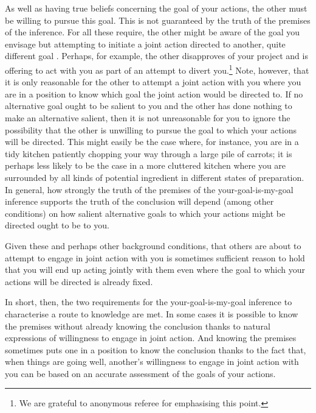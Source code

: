 \documentclass[12pt,\papersize]{extarticle}
\begin{document}
As well as having true beliefs concerning the goal of your actions, the other must be willing to pursue this goal. 
This is not guaranteed by the truth of the premises of the inference. 
For all these require, the other might be aware of the goal you envisage but attempting to initiate a joint action directed to another, quite different goal%
.  
Perhaps, for example, the other disapproves of your project and is offering to act with you as part of an attempt to divert you.\footnote{
We are grateful to anonymous referee for emphasising this point.
}
Note, however, that it is only reasonable for the other to attempt a joint action with you where you are in a position to know which goal the joint action would be directed to. 
If no alternative goal ought to be salient to you and the other has done nothing to make an alternative salient, then it is not unreasonable for you to ignore the possibility that the other is unwilling to pursue the goal to which your actions will be directed. 
This might easily be the case where, for instance, you are in a tidy kitchen patiently chopping your way through a large pile of carrots; it is perhaps less likely to be the case in a more cluttered kitchen where you are surrounded by all kinds of potential ingredient in different states of preparation. 
In general, how strongly the truth of the premises of the your-goal-is-my-goal inference supports the truth of the conclusion will depend (among other conditions) on how salient alternative goals to which your actions might be directed ought to be to you.

Given these and perhaps other background conditions,
that others are about to attempt to engage in joint action with you 
is sometimes sufficient reason to hold that
you will end up acting jointly with them
 even where the goal to which your actions will be directed is already fixed.

In short, then, the two requirements for the your-goal-is-my-goal inference to characterise a route to knowledge are met.  
In some cases it is possible to know the premises without already knowing the conclusion thanks to natural expressions of willingness to engage in joint action.  
And knowing the premises sometimes puts one in a position to know the conclusion thanks to the fact that, when things are going well, another's willingness to engage in joint action with you can be based on an accurate assessment of the goals of your actions.
\end{document}
